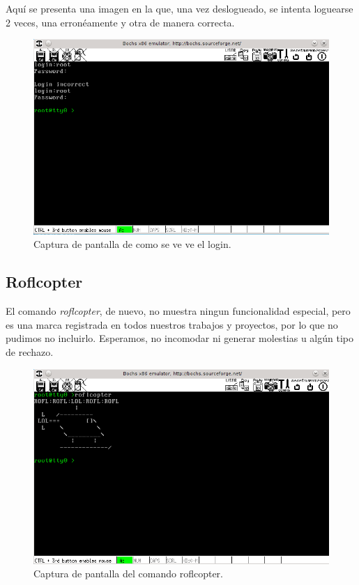 \documentclass[a4paper,10pt]{article}
\begin{document}
      Aquí se presenta una imagen en la que, una vez deslogueado, se intenta loguearse 2 veces, una erronéamente y otra de manera correcta.
     \begin{figure}[H]
      \begin{center}
      \includegraphics[scale=0.65]{./images/login.png}
	 \caption{Captura de pantalla de como se ve ve el login.}
      \end{center}
      \end{figure}

      \subsection{Roflcopter}
      El comando \textit{roflcopter}, de nuevo, no muestra ningun funcionalidad especial, pero es una marca registrada en todos nuestros trabajos y proyectos,
      por lo que no pudimos no incluirlo. Esperamos, no incomodar ni generar molestias u algún tipo de rechazo.

     \begin{figure}[H]
      \begin{center}
      \includegraphics[scale=0.65]{./images/roflcopter.png}
	 \caption{Captura de pantalla del comando roflcopter.}
      \end{center}
      \end{figure}
\end{document}
